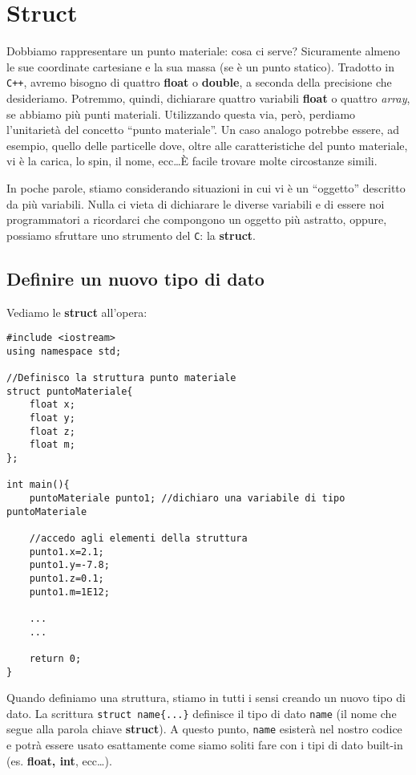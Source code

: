 \chapter{Struct} \label{struct}
Dobbiamo rappresentare un punto materiale: cosa ci serve? Sicuramente almeno le sue coordinate cartesiane e la sua massa (se è un punto statico). Tradotto in \verb|C++|, avremo bisogno di quattro \textbf{float} o \textbf{double}, a seconda della precisione che desideriamo. Potremmo, quindi, dichiarare quattro variabili \textbf{float} o quattro \emph{array}, se abbiamo più punti materiali. Utilizzando questa via, però, perdiamo l'unitarietà del concetto ``punto materiale''. Un caso analogo potrebbe essere, ad esempio, quello delle particelle dove, oltre alle caratteristiche del punto materiale, vi è la carica, lo spin, il nome, ecc\ldots È facile trovare molte circostanze simili.

In poche parole, stiamo considerando situazioni in cui vi è un ``oggetto'' descritto da più variabili. Nulla ci vieta di dichiarare le diverse variabili e di essere noi programmatori a ricordarci che compongono un oggetto più astratto, oppure, possiamo sfruttare uno strumento del \verb|C|: la \textbf{struct}.

\section{Definire un nuovo tipo di dato}
Vediamo le \textbf{struct} all'opera:
\begin{lstlisting}
#include <iostream>
using namespace std;

//Definisco la struttura punto materiale
struct puntoMateriale{
	float x;
	float y;
	float z;
	float m;
};

int main(){
	puntoMateriale punto1; //dichiaro una variabile di tipo puntoMateriale

	//accedo agli elementi della struttura
	punto1.x=2.1;
	punto1.y=-7.8;
	punto1.z=0.1;
	punto1.m=1E12;
	
	...
	...
	
	return 0;
}
\end{lstlisting}\label{struct1}

Quando definiamo una struttura, stiamo in tutti i sensi creando un nuovo tipo di dato. La scrittura \lstinline|struct name{...}| definisce il tipo di dato \verb|name| (il nome che segue alla parola chiave \textbf{struct}). A questo punto, \verb|name| esisterà nel nostro codice e potrà essere usato esattamente come siamo soliti fare con i tipi di dato built-in (es. \textbf{float, int}, ecc\ldots). 

